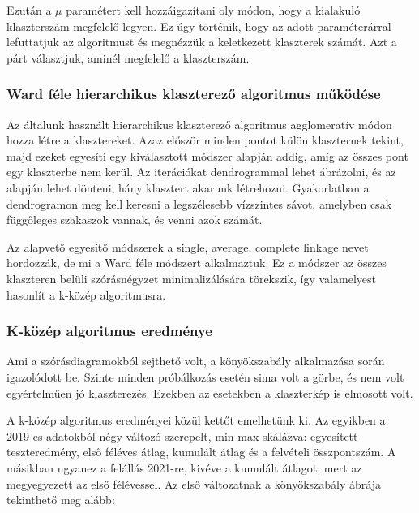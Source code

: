 \documentclass[12pt]{article}
\begin{document}
Ezután a $\mu$ paramétert kell hozzáigazítani oly módon, hogy a kialakuló klaszterszám megfelelő legyen. Ez úgy történik, hogy az adott paraméterárral lefuttatjuk az algoritmust és megnézzük a keletkezett klaszterek számát. Azt a párt választjuk, aminél megfelelő a klaszterszám.

\subsubsection{Ward féle hierarchikus klaszterező algoritmus működése}

Az általunk használt hierarchikus klaszterező algoritmus agglomeratív módon hozza létre a klasztereket. Azaz először minden pontot külön klaszternek tekint, majd ezeket egyesíti egy kiválasztott módszer alapján addig, amíg az összes pont egy klaszterbe nem kerül. Az iterációkat dendrogrammal lehet ábrázolni, és az alapján lehet dönteni, hány klasztert akarunk létrehozni. Gyakorlatban a dendrogramon meg kell keresni a legszélesebb vízszintes sávot, amelyben csak függőleges szakaszok vannak, és venni azok számát.

Az alapvető egyesítő módszerek a single, average, complete linkage nevet hordozzák, de mi a Ward féle módszert alkalmaztuk. Ez a módszer az összes klaszteren belüli szórásnégyzet minimalizálására törekszik, így valamelyest hasonlít a k-közép algoritmusra.

\subsubsection{K-közép algoritmus eredménye}
Ami a szórásdiagramokból sejthető volt, a könyökszabály alkalmazása során igazolódott be. Szinte minden próbálkozás esetén sima volt a görbe, és nem volt egyértelműen jó klaszterezés. Ezekben az esetekben a klaszterkép is elmosott volt.

A k-közép algoritmus eredményei közül kettőt emelhetünk ki. Az egyikben a 2019-es adatokból négy változó szerepelt, min-max skálázva: egyesített teszteredmény, első féléves átlag, kumulált átlag és a felvételi összpontszám. A másikban ugyanez a felállás 2021-re, kivéve a kumulált átlagot, mert az megyegyezett az első félévessel. Az első változatnak a könyökszabály ábrája tekinthető meg alább:
\end{document}
